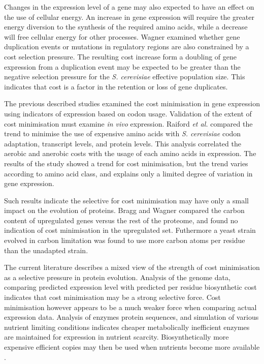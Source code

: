 Changes in the expression level of a gene may also expected to have an effect on the use of cellular energy. An increase in gene expression will require the greater energy diversion to the synthesis of the required amino acids, while a decrease will free cellular energy for other processes. Wagner \cite{wager2005} examined whether gene duplication events or mutations in regulatory regions are also constrained by a cost selection pressure. The resulting cost increase form a doubling of gene expression from a duplication event may be expected to be greater than the negative selection pressure for the \emph{S. cerevisiae} effective population size. This indicates that cost is a factor in the retention or loss of gene duplicates.

The previous described studies examined the cost minimisation in gene expression using indicators of expression based on codon usage. Validation of the extent of cost minimisation must examine \emph{in vivo} expression. Raiford \emph{et al.} \cite{raiford2008} compared the trend to minimise the use of expensive amino acids with \emph{S. cerevisiae} codon adaptation, transcript levels, and protein levels. This analysis correlated the aerobic and anerobic costs with the usage of each amino acids in expression. The results of the study showed a trend for cost minimisation, but the trend varies according to amino acid class, and explains only a limited degree of variation in gene expression.

Such results indicate the selective for cost minimisation may have only a small impact on the evolution of proteins. Bragg and Wagner \cite{bragg2007} compared the carbon content of upregulated genes versus the rest of the proteome, and found no indication of cost minimisation in the upregulated set. Futhermore a yeast strain evolved in carbon limitation was found to use more carbon atoms per residue than the unadapted strain.

The current literature describes a mixed view of the strength of cost minimisation as a selective pressure in protein evolution. Analysis of the genome data, comparing predicted expression level with predicted per residue biosynthetic cost indicates that cost minimisation may be a strong selective force. Cost minimisation however appears to be a much weaker force when comparing actual expression data. Analysis of enzymes protein sequences, and simulation of various nutrient limiting conditions indicates cheaper metabolically inefficient enzymes are maintained for expression in nutrient scarcity. Biosynthetically more expensive efficient copies may then be used when nutrients become more available \cite{carlson2007}.


